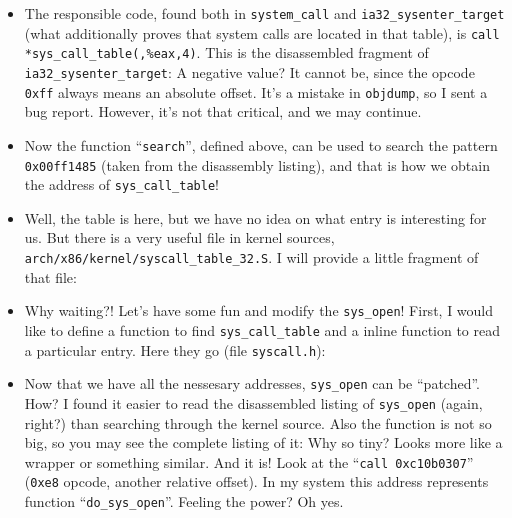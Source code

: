 \documentclass[12pt]{article}
\begin{document}
  \begin{itemize}
  \item The responsible code, found both in \verb!system_call! and
    \verb!ia32_sysenter_target! (what additionally proves that system
    calls are located in that table), is
    \verb!call *sys_call_table(,%eax,4)!. This is the disassembled
    fragment of \verb!ia32_sysenter_target!:
     A negative value?  It cannot be,
    since the opcode \verb!0xff! always means an absolute offset. It's
    a mistake in \verb!objdump!, so I sent a bug report. However, it's
    not that critical, and we may continue.

  \item Now the function ``\verb!search!'', defined above, can be used
    to search the pattern \verb!0x00ff1485! (taken from the
    disassembly listing), and that is how we obtain the address of
    \verb!sys_call_table!!

  \item Well, the table is here, but we have no idea on what entry is
    interesting for us. But there is a very useful file in kernel
    sources, \verb!arch/x86/kernel/syscall_table_32.S!. I will provide
    a little fragment of that file: 

  \item Why waiting?! Let's have some fun and modify the
    \verb!sys_open!!  First, I would like to define a function to find
    \verb!sys_call_table! and a inline function to read a particular
    entry. Here they go (file \verb!syscall.h!): 

  \item Now that we have all the nessesary addresses, \verb!sys_open!
    can be ``patched''. How? I found it easier to read the
    disassembled listing of \verb!sys_open! (again, right?) than
    searching through the kernel source. Also the function is not so
    big, so you may see the complete listing of it:
     Why so tiny? Looks more like a wrapper
    or something similar. And it is! Look at the
    ``\verb!call 0xc10b0307!'' (\verb!0xe8! opcode, another relative
    offset). In my system this address represents function
    ``\verb!do_sys_open!''. Feeling the power? Oh yes.


\end{itemize}
\end{document}
